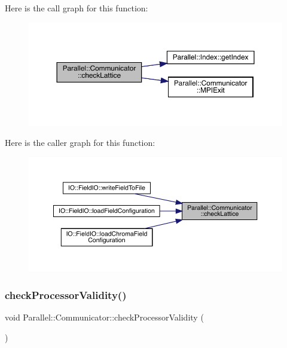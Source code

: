 Here is the call graph for this function\+:\nopagebreak
\begin{figure}[H]
\begin{center}
\leavevmode
\includegraphics[width=350pt]{class_parallel_1_1_communicator_a0975f377dbde235d418ca7054001f3a3_cgraph}
\end{center}
\end{figure}
Here is the caller graph for this function\+:\nopagebreak
\begin{figure}[H]
\begin{center}
\leavevmode
\includegraphics[width=350pt]{class_parallel_1_1_communicator_a0975f377dbde235d418ca7054001f3a3_icgraph}
\end{center}
\end{figure}
\mbox{\label{class_parallel_1_1_communicator_af507f05e369586d3ffea12d366e972ef}} 
\subsubsection{\texorpdfstring{checkProcessorValidity()}{checkProcessorValidity()}}
{\footnotesize\ttfamily void Parallel\+::\+Communicator\+::check\+Processor\+Validity (\begin{DoxyParamCaption}{ }\end{DoxyParamCaption})\hspace{0.3cm}{\ttfamily [static]}}

